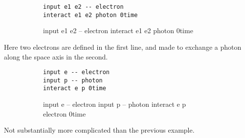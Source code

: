 \documentclass[12pt]{article}
\begin{document}
\begin{figure}[h!]\begin{subfigure}[h]{0.4\textwidth}\begin{center}
\begin{lstlisting}
input e1 e2 -- electron
interact e1 e2 photon 0time
\end{lstlisting}
\end{center}\end{subfigure}\hfill\vrule\hfill\begin{subfigure}[h]{0.4\textwidth}\begin{center}
\begin{feynr}
input e1 e2 -- electron
interact e1 e2 photon 0time
\end{feynr}
\end{center}\end{subfigure}\end{figure}
Here two electrons are defined in the first line, and made to exchange a photon along the space axis in the second.

\begin{figure}[h!]\begin{subfigure}[h]{0.4\textwidth}\begin{center}
\begin{lstlisting}
input e -- electron
input p -- photon
interact e p 0time
\end{lstlisting}
\end{center}\end{subfigure}\hfill\vrule\hfill\begin{subfigure}[h]{0.4\textwidth}\begin{center}
\begin{feynr}
input e -- electron
input p -- photon
interact e p electron 0time
\end{feynr}
\end{center}\end{subfigure}\end{figure}
Not substantially more complicated than the previous example.
\end{document}
